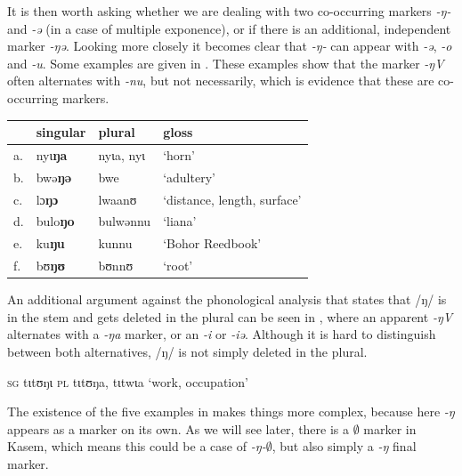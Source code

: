 It is then worth asking whether we are dealing with two co-occurring markers \textit{-ŋ-} and \textit{-ə} (in a case of multiple exponence), or if there is an additional, independent marker \textit{-ŋə}. Looking more closely it becomes clear that \textit{-ŋ-} can appear with \textit{-ə}, \textit{-o} and \textit{-u}. Some examples are given in . These examples show that the marker \textit{-ŋV} often alternates with \textit{-nu}, but not necessarily, which is evidence that these are co-occurring markers.

\begin{exe}
    \ex \label{exes-ng}
    \begin{tabular}[t]{llll}
      & singular        & plural    & gloss                       \\
      \midrule
      a. & nyɩ\textbf{ŋa}  & nyɩa, nyɩ & `horn'                      \\
      b. & bwə\textbf{ŋə}  & bwe       & `adultery'                  \\
      c. & lɔ\textbf{ŋɔ}   & lwaanʊ    & `distance, length, surface' \\
      d. & bulo\textbf{ŋo} & bulwənnu  & `liana'                     \\
      e. & ku\textbf{ŋu}   & kunnu     & `Bohor Reedbook'            \\
      f. & bʊ\textbf{ŋʊ}   & bʊnnʊ     & `root'                      \\
    \end{tabular}
\end{exe}

An additional argument against the phonological analysis that states that /ŋ/ is in the stem and gets deleted in the plural can be seen in , where an apparent  \textit{-ŋV} alternates with a \textit{-ŋa} marker, or an \textit{-i} or \textit{-iə}. Although it is hard to distinguish between both alternatives, /ŋ/ is not simply deleted in the plural.

\begin{exe}
    \ex \label{except-ng2} \textsc{sg} tɩtʊŋɩ \textsc{pl} tɩtʊŋa, tɩtwɩa `work, occupation'
\end{exe}

The existence of the five examples in  makes things more complex, because here \textit{-ŋ} appears as a marker on its own. As we will see later, there is a $\emptyset$ marker in Kasem, which means this could be a case of \textit{-ŋ-$\emptyset$}, but also simply a \textit{-ŋ} final marker.

